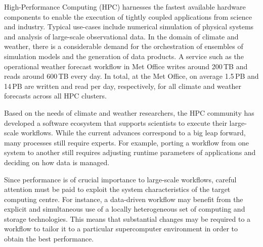 \documentclass{superfri}
\newcommand{\lr}[1]{\textcolor{cyan}{LR: #1}}
\begin{document}
High-Performance Computing (HPC) harnesses the fastest available hardware components to enable the execution of tightly coupled applications from science and industry.
Typical use-cases include numerical simulation of physical systems and analysis of large-scale observational data.
In the domain of climate and weather, there is a considerable demand for the orchestration of ensembles of simulation models and the generation of data products.
A service such as the operational weather forecast workflow in Met Office writes around 200\,TB and reads around 600\,TB every day.
In total, at the Met Office, on average 1.5\,PB and 14\,PB are written and read per day, respectively, for all climate and weather forecasts across all HPC clusters.

Based on the needs of climate and weather researchers, the HPC community has developed a software ecosystem that supports scientists to execute their large-scale workflows.
While the current advances correspond to a big leap forward, many processes still require experts.
For example, porting a workflow from one system to another still requires adjusting runtime parameters of applications and deciding on how data is managed.

Since performance is of crucial importance to large-scale workflows, careful attention must be paid to exploit the system characteristics of the target computing centre.
For instance, a data-driven workflow may benefit from the explicit and simultaneous use of a locally heterogeneous set of computing and storage technologies.
This means that substantial changes may be required to a workflow to tailor it to a particular supercomputer environment in order to obtain the best performance.
\end{document}
